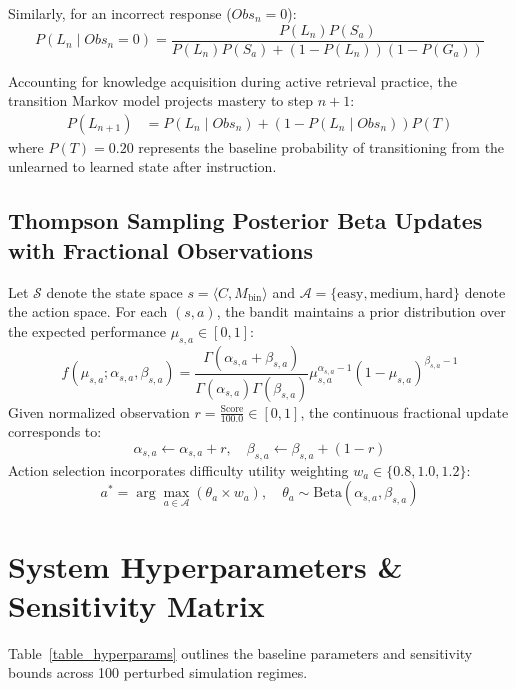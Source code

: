 \documentclass[10pt,journal,compsoc]{IEEEtran}
\begin{document}
Similarly, for an incorrect response ($Obs_n = 0$):
\begin{equation}
P(L_n \mid Obs_n = 0) = \frac{P(L_n)P(S_a)}{P(L_n)P(S_a) + (1 - P(L_n))(1 - P(G_a))}
\end{equation}

Accounting for knowledge acquisition during active retrieval practice, the transition Markov model projects mastery to step $n+1$:
\begin{align}
P(L_{n+1}) &= P(L_n \mid Obs_n) + (1 - P(L_n \mid Obs_n)) P(T)
\end{align}
where $P(T) = 0.20$ represents the baseline probability of transitioning from the unlearned to learned state after instruction.

\subsection{Thompson Sampling Posterior Beta Updates with Fractional Observations}
Let $\mathcal{S}$ denote the state space $s = \langle C, M_{\text{bin}} \rangle$ and $\mathcal{A} = \{\text{easy}, \text{medium}, \text{hard}\}$ denote the action space. For each $(s, a)$, the bandit maintains a prior distribution over the expected performance $\mu_{s,a} \in [0, 1]$:
\begin{equation}
f(\mu_{s,a}; \alpha_{s,a}, \beta_{s,a}) = \frac{\Gamma(\alpha_{s,a} + \beta_{s,a})}{\Gamma(\alpha_{s,a})\Gamma(\beta_{s,a})} \mu_{s,a}^{\alpha_{s,a} - 1} (1 - \mu_{s,a})^{\beta_{s,a} - 1}
\end{equation}
Given normalized observation $r = \frac{\text{Score}}{100.0} \in [0, 1]$, the continuous fractional update corresponds to:
\begin{equation}
\alpha_{s,a} \leftarrow \alpha_{s,a} + r, \quad \beta_{s,a} \leftarrow \beta_{s,a} + (1 - r)
\end{equation}
Action selection incorporates difficulty utility weighting $w_a \in \{0.8, 1.0, 1.2\}$:
\begin{equation}
a^* = \arg\max_{a \in \mathcal{A}} \left( \theta_a \times w_a \right), \quad \theta_a \sim \text{Beta}(\alpha_{s,a}, \beta_{s,a})
\end{equation}

\section{System Hyperparameters \& Sensitivity Matrix}
Table~\ref{table_hyperparams} outlines the baseline parameters and sensitivity bounds across 100 perturbed simulation regimes.
\end{document}

